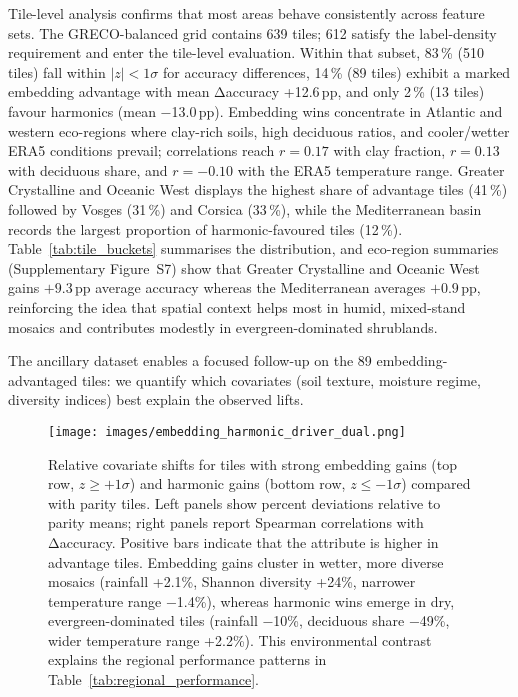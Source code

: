 \documentclass[utf8]{FrontiersinHarvard}
\begin{document}
Tile-level analysis confirms that most areas behave consistently across feature sets. The GRECO-balanced grid contains 639 tiles; 612 satisfy the label-density requirement and enter the tile-level evaluation. Within that subset, 83\,\% (510 tiles) fall within \(|z| < 1\sigma\) for accuracy differences, 14\,\% (89 tiles) exhibit a marked embedding advantage with mean Δaccuracy +12.6\,pp, and only 2\,\% (13 tiles) favour harmonics (mean −13.0\,pp). Embedding wins concentrate in Atlantic and western eco-regions where clay-rich soils, high deciduous ratios, and cooler/wetter ERA5 conditions prevail; correlations reach \(r=0.17\) with clay fraction, \(r=0.13\) with deciduous share, and \(r=-0.10\) with the ERA5 temperature range. Greater Crystalline and Oceanic West displays the highest share of advantage tiles (41\,\%) followed by Vosges (31\,\%) and Corsica (33\,\%), while the Mediterranean basin records the largest proportion of harmonic-favoured tiles (12\,\%). Table~\ref{tab:tile_buckets} summarises the distribution, and eco-region summaries (Supplementary Figure~S7) show that Greater Crystalline and Oceanic West gains \(+9.3\)\,pp average accuracy whereas the Mediterranean averages \(+0.9\)\,pp, reinforcing the idea that spatial context helps most in humid, mixed-stand mosaics and contributes modestly in evergreen-dominated shrublands.

The ancillary dataset enables a focused follow-up on the 89 embedding-advantaged tiles: we quantify which covariates (soil texture, moisture regime, diversity indices) best explain the observed lifts.

\begin{figure}[H]
    \centering
    \texttt{[image: images/embedding\_harmonic\_driver\_dual.png]}
    \caption{Relative covariate shifts for tiles with strong embedding gains (top row, \(z \ge +1\sigma\)) and harmonic gains (bottom row, \(z \le -1\sigma\)) compared with parity tiles. Left panels show percent deviations relative to parity means; right panels report Spearman correlations with Δaccuracy. Positive bars indicate that the attribute is higher in advantage tiles. Embedding gains cluster in wetter, more diverse mosaics (rainfall +2.1\%, Shannon diversity +24\%, narrower temperature range −1.4\%), whereas harmonic wins emerge in dry, evergreen-dominated tiles (rainfall −10\%, deciduous share −49\%, wider temperature range +2.2\%). This environmental contrast explains the regional performance patterns in Table~\ref{tab:regional_performance}.}
    \label{fig:driver_deltas}
\end{figure}
\end{document}
